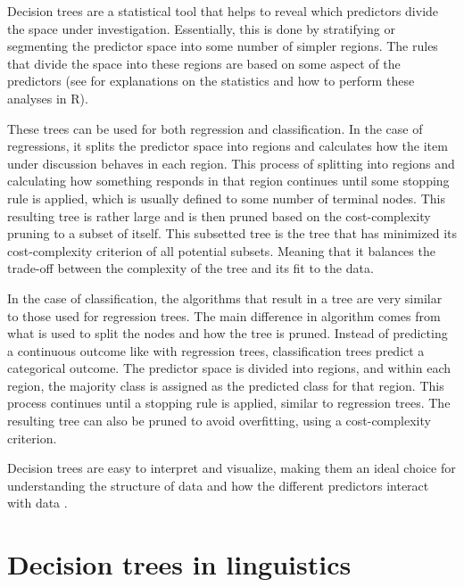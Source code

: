 Decision trees are a statistical tool that helps to reveal which predictors divide the space under investigation. Essentially, this is done by stratifying or segmenting the predictor space into some number of simpler regions. The rules that divide the space into these regions are based on some aspect of the predictors (see \cite{hastieElementsStatisticalLearning2009,jamesIntroductionStatisticalLearning2021} for explanations on the statistics and how to perform these analyses in R). 

These trees can be used for both regression and classification. In the case of regressions, it splits the predictor space into regions and calculates how the item under discussion behaves in each region. This process of splitting into regions and calculating how something responds in that region continues until some stopping rule is applied, which is usually defined to some number of terminal nodes. This resulting tree is rather large and is then pruned based on the cost-complexity pruning to a subset of itself. This subsetted tree is the tree that has minimized its cost-complexity criterion of all potential subsets. Meaning that it balances the trade-off between the complexity of the tree and its fit to the data. 

In the case of classification, the algorithms that result in a tree are very similar to those used for regression trees. The main difference in algorithm comes from what is used to split the nodes and how the tree is pruned. Instead of predicting a continuous outcome like with regression trees, classification trees predict a categorical outcome. The predictor space is divided into regions, and within each region, the majority class is assigned as the predicted class for that region. This process continues until a stopping rule is applied, similar to regression trees. The resulting tree can also be pruned to avoid overfitting, using a cost-complexity criterion.

Decision trees are easy to interpret and visualize, making them an ideal choice for understanding the structure of data and how the different predictors interact with data \citep{hastieElementsStatisticalLearning2009,jamesIntroductionStatisticalLearning2021}.

\section{Decision trees in linguistics}\label{sec:dt_linguistics}


